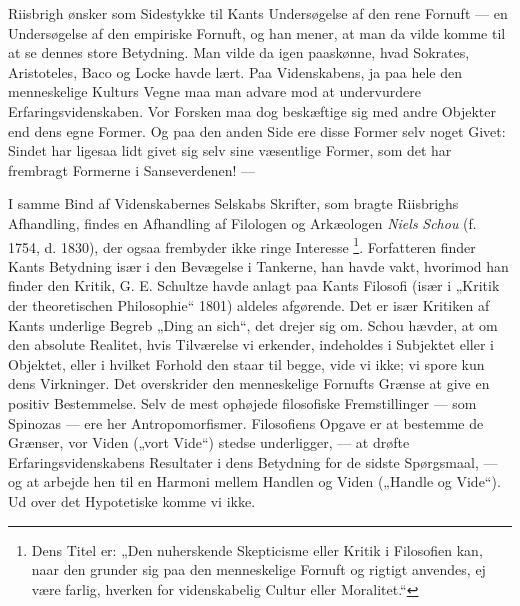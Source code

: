 \documentclass[12pt,a4paper,openany]{book}
\newcommand{\opage}[1]{\marginnote{\footnotesize\textit{[#1]}}}
\begin{document}
Riisbrigh ønsker som Sidestykke til Kants Undersøgelse af den rene Fornuft ---
en Undersøgelse af den empiriske Fornuft, og han mener, at man da vilde komme
til at se dennes store Betydning. Man vilde da igen paaskønne, hvad Sokrates,
Aristoteles, Baco og Locke havde lært. Paa Videnskabens, ja paa hele den
menneskelige Kulturs Vegne maa man advare mod at undervurdere
Erfaringsvidenskaben. Vor Forsken maa dog beskæftige sig med andre Objekter end
dens egne Former. Og paa den anden Side ere disse Former selv noget Givet:
Sindet har ligesaa lidt givet sig selv sine væsentlige Former, som det har
frembragt Formerne i Sanseverdenen! ---

I samme Bind af Videnskabernes Selskabs Skrifter, som bragte Riisbrighs
Afhandling, findes en Afhandling af Filologen og Arkæologen \emph{Niels}
\emph{Schou} (f. 1754, d. 1830), der ogsaa frembyder ikke ringe Interesse%
\footnote[1]{Dens Titel er: „Den nuherskende Skepticisme eller Kritik i
Filosofien kan, naar den grunder sig paa den menneskelige Fornuft og rigtigt
anvendes, ej være farlig, hverken for videnskabelig Cultur eller Moralitet.“}.
Forfatteren finder Kants Betydning især i den Bevægelse i Tankerne, han havde
vakt, hvorimod han finder den Kritik, G. E. Schultze havde anlagt paa Kants
Filosofi (især i „Kritik der theoretischen Philosophie“ 1801) aldeles
afgørende. Det er især Kritiken af Kants underlige Begreb „Ding an sich“, det
drejer sig om. Schou hævder, at om den absolute Realitet, hvis Tilværelse vi
erkender, indeholdes i Subjektet eller i Objektet, eller i hvilket Forhold den
staar til begge, vide vi ikke; vi spore kun dens Virkninger. Det overskrider
den menneskelige Fornufts Grænse at give en positiv Bestemmelse. Selv de mest
ophøjede filosofiske Fremstillinger --- som Spinozas --- ere her
Antropomorfismer. Filosofiens Opgave er at bestemme de Grænser, vor Viden
(„vort Vide“) stedse underligger, --- at drøfte Erfaringsvidenskabens Resultater i
\setcounter{footnote}{0}%
\opage{37}dens Betydning for de sidste Spørgsmaal, --- og at arbejde hen til en
Harmoni mellem Handlen og Viden („Handle og Vide“). Ud over det Hypotetiske
komme vi ikke.
\end{document}
